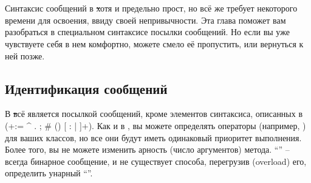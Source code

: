 \documentclass[a4paper,10pt,twoside]{book}
\begin{document}
	\renewcommand{\nnbb}[2]{} %
	\sloppy
\fi
\chapter{}

Синтаксис сообщений в \st хотя и предельно прост, но всё же требует некоторого времени для освоения, ввиду своей непривычности.
Эта глава поможет вам разобраться в специальном синтаксисе посылки сообщений.
Но если вы уже чувствуете себя в нем комфортно, можете смело её пропустить, или вернуться к ней позже.

\section{Идентификация сообщений}

В \st всё является посылкой сообщений, кроме элементов синтаксиса, описанных в  (\ct+:= ^ . ; # () {} [ : | ]+).
Как и в , вы можете определять операторы (например, \ct{+}) для ваших классов, но все они будут иметь одинаковый приоритет выполнения.
Более того, вы не можете изменить арность (число аргументов) метода. ``\ct{-}'' -- всегда бинарное сообщение, и не существует способа, перегрузив (overload) его, определить унарный ``\ct{-}''.
\end{document}

